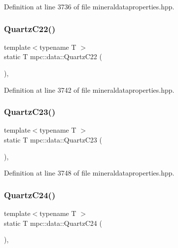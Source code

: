 Definition at line 3736 of file mineraldataproperties.\+hpp.

\mbox{\label{namespacempc_1_1data_a2779c542c70a49b6aa46b2f4c51d0d7f}} 
\subsubsection{\texorpdfstring{Quartz\+C22()}{QuartzC22()}}
{\footnotesize\ttfamily template$<$typename T $>$ \\
static T mpc\+::data\+::\+Quartz\+C22 (\begin{DoxyParamCaption}{ }\end{DoxyParamCaption})\hspace{0.3cm}{\ttfamily [inline]}, {\ttfamily [static]}}



Definition at line 3742 of file mineraldataproperties.\+hpp.

\mbox{\label{namespacempc_1_1data_a5d7209e35c2db94425f014fa1a06cbb0}} 
\subsubsection{\texorpdfstring{Quartz\+C23()}{QuartzC23()}}
{\footnotesize\ttfamily template$<$typename T $>$ \\
static T mpc\+::data\+::\+Quartz\+C23 (\begin{DoxyParamCaption}{ }\end{DoxyParamCaption})\hspace{0.3cm}{\ttfamily [inline]}, {\ttfamily [static]}}



Definition at line 3748 of file mineraldataproperties.\+hpp.

\mbox{\label{namespacempc_1_1data_a465213d9ac9cdde3d80ff7612aa900ab}} 
\subsubsection{\texorpdfstring{Quartz\+C24()}{QuartzC24()}}
{\footnotesize\ttfamily template$<$typename T $>$ \\
static T mpc\+::data\+::\+Quartz\+C24 (\begin{DoxyParamCaption}{ }\end{DoxyParamCaption})\hspace{0.3cm}{\ttfamily [inline]}, {\ttfamily [static]}}



